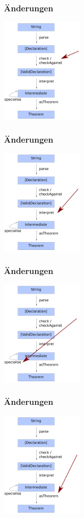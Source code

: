 \documentclass{beamer}
\begin{document}
\begin{frame}
\frametitle{Änderungen}
\includegraphics[height=200px]{overview-free-theorems-pfeil2}
\end{frame}

\begin{frame}
\frametitle{Änderungen}
\includegraphics[height=200px]{overview-free-theorems-pfeil3}
\end{frame}

\begin{frame}
\frametitle{Änderungen}
\includegraphics[height=200px]{overview-free-theorems-pfeil4}
\end{frame}


\begin{frame}
\frametitle{Änderungen}
\includegraphics[height=200px]{overview-free-theorems-pfeil5}
\end{frame}
\end{document}
